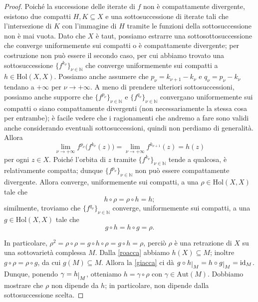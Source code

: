 \begin{proof}
    Poiché la successione delle iterate di $f$ non è compattamente divergente, esistono due compatti $H,K\subseteq X$ e una sottosuccessione di iterate tali che l'intersezione di $K$ con l'immagine di $H$ tramite le funzioni della sottosuccessione non è mai vuota. Dato che $X$ è taut, possiamo estrarre una sottosottosuccessione che converge uniformemente sui compatti o è compattamente divergente; per costruzione non può essere il secondo caso, per cui abbiamo trovato una sottosuccessione $\{f^{k_{\nu}}\}_{\nu\in\mathbb{N}}$ che converge uniformemente sui compatti a $h\in\text{Hol}(X,X)$. Possiamo anche assumere che $p_\nu=k_{\nu+1}-k_\nu$ e $q_\nu=p_\nu-k_\nu$ tendano a $+\infty$ per $\nu\longrightarrow+\infty$. A meno di prendere ulteriori sottosuccessioni, possiamo anche supporre che $\{f^{p_\nu}\}_{\nu\in\mathbb{N}}$ e $\{f^{q_\nu}\}_{\nu\in\mathbb{N}}$ convergano uniformemente sui compatti o siano compattamente divergenti (non necessariamente la stessa cosa per entrambe); è facile vedere che i ragionamenti che andremo a fare sono validi anche considerando eventuali sottosuccessioni, quindi non perdiamo di generalità. Allora
    $$\lim_{\nu\longrightarrow+\infty}f^{p_\nu}\big(f^{k_\nu}(z)\big)=\lim_{\nu\longrightarrow+\infty}f^{k_{\nu+1}}(z)=h(z)$$
    per ogni $z \in X$. Poiché l'orbita di $z$ tramite $\{f^{k_\nu}\}_{\nu\in\mathbb{N}}$ tende a qualcosa, è relativamente compatta; dunque $\{f^{p_\nu}\}_{\nu\in\mathbb{N}}$ non può essere compattamente divergente. Allora converge, uniformemente sui compatti, a una $\rho\in\text{Hol}(X,X)$ tale che
    \begin{equation} \label{roacca}
        h\circ\rho=\rho\circ h=h;
    \end{equation}
    similmente, troviamo che $\{f^{q_\nu}\}_{\nu\in\mathbb{N}}$ converge, uniformemente sui compatti, a una $g\in\text{Hol}(X,X)$ tale che
    \begin{equation} \label{giacca}
        g\circ h=h\circ g=\rho.
    \end{equation}

    In particolare, $\rho^2=\rho\circ\rho=g\circ h\circ\rho=g\circ h=\rho$, perciò $\rho$ è una retrazione di $X$ su una sottovarietà complessa $M$. Dalla \eqref{roacca} abbiamo $h(X)\subseteq M$; inoltre $g\circ\rho=\rho\circ g$, da cui $g(M)\subseteq M$. Allora la \eqref{giacca} ci dà $g\circ h\restrict{M}=h\circ g\restrict{M}=\id_M$. Dunque, ponendo $\gamma=h\restrict{M}$, otteniamo $h=\gamma\circ\rho$ con $\gamma\in\text{Aut}(M)$. Dobbiamo mostrare che $\rho$ non dipende da $h$; in particolare, non dipende dalla sottosuccessione scelta.


\end{proof}
